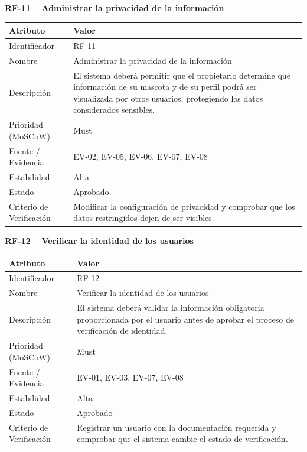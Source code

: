 \documentclass[journal,onecolumn]{IEEEtran}
\begin{document}
	\textbf{RF-11 -- Administrar la privacidad de la información}
	\begin{table}[H]
		\centering\small
		\begin{tabularx}{\linewidth}{|l|X|}
			\hline
			\textbf{Atributo} & \textbf{Valor} \\ \hline
			Identificador & RF-11 \\ \hline
			Nombre & Administrar la privacidad de la información \\ \hline
			Descripción & El sistema deberá permitir que el propietario determine qué información de su mascota y de su perfil podrá ser visualizada por otros usuarios, protegiendo los datos considerados sensibles. \\ \hline
			Prioridad (MoSCoW) & Must \\ \hline
			Fuente / Evidencia & EV-02, EV-05, EV-06, EV-07, EV-08 \\ \hline
			Estabilidad & Alta \\ \hline
			Estado & Aprobado \\ \hline
			Criterio de Verificación & Modificar la configuración de privacidad y comprobar que los datos restringidos dejen de ser visibles. \\ \hline
		\end{tabularx}
	\end{table}
	
	\textbf{RF-12 -- Verificar la identidad de los usuarios}
	\begin{table}[H]
		\centering\small
		\begin{tabularx}{\linewidth}{|l|X|}
			\hline
			\textbf{Atributo} & \textbf{Valor} \\ \hline
			Identificador & RF-12 \\ \hline
			Nombre & Verificar la identidad de los usuarios \\ \hline
			Descripción & El sistema deberá validar la información obligatoria proporcionada por el usuario antes de aprobar el proceso de verificación de identidad. \\ \hline
			Prioridad (MoSCoW) & Must \\ \hline
			Fuente / Evidencia & EV-01, EV-03, EV-07, EV-08 \\ \hline
			Estabilidad & Alta \\ \hline
			Estado & Aprobado \\ \hline
			Criterio de Verificación & Registrar un usuario con la documentación requerida y comprobar que el sistema cambie el estado de verificación. \\ \hline
		\end{tabularx}
	\end{table}
	
\end{document}
